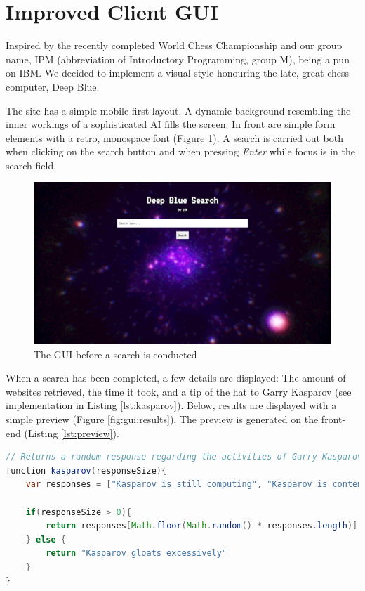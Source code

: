 \section{Improved Client GUI}
Inspired by the recently completed World Chess Championship and our group name, IPM (abbreviation of Introductory Programming, group M), being a pun on IBM. We decided to implement a visual style honouring the late, great chess computer, Deep Blue.

The site has a simple mobile-first layout. A dynamic background resembling the inner workings of a sophisticated AI fills the screen. In front are simple form elements with a retro, monospace font (Figure \ref{fig:gui:noResults}). A search is carried out both when clicking on the search button and when pressing \textit{Enter} while focus is in the search field. 

\begin{figure} [h]
	\centering
	\includegraphics[width=\textwidth]{graphics/gui-noResults.png}
	\caption{The GUI before a search is conducted}
	\label{fig:gui:noResults}
\end{figure}

When a search has been completed, a few details are displayed: The amount of websites retrieved, the time it took, and a tip of the hat to Garry Kasparov (see implementation in Listing \ref{lst:kasparov}). Below, results are displayed with a simple preview (Figure \ref{fig:gui:results}). The preview is generated on the front-end (Listing \ref{lst:preview}).

\begin{lstlisting}[language=Java,
	caption={The Kasparov Algorithm},
	label={lst:kasparov}]
// Returns a random response regarding the activities of Garry Kasparov
function kasparov(responseSize){
	var responses = ["Kasparov is still computing", "Kasparov is contemplating e4", "Kasparov retrieved none", "Kasparov regrets the Sicilian Defense"];

	if(responseSize > 0){
		return responses[Math.floor(Math.random() * responses.length)];
	} else {
		return "Kasparov gloats excessively"
	}
}
\end{lstlisting}

